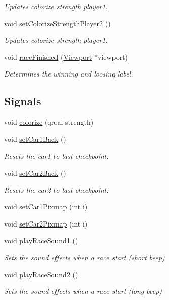 \begin{DoxyCompactItemize}
\begin{DoxyCompactList}\small\item\em Updates colorize strength player1. \end{DoxyCompactList}\item 
void \mbox{\hyperlink{class_world_aef2a19f30cc4445ea4d49dd5b2db6d78}{set\+Colorize\+Strength\+Player2}} ()
\begin{DoxyCompactList}\small\item\em Updates colorize strength player1. \end{DoxyCompactList}\item 
void \mbox{\hyperlink{class_world_a59863cbf211a2d2fdb5ef7ee85b2e246}{race\+Finished}} (\mbox{\hyperlink{class_viewport}{Viewport}} $\ast$viewport)
\begin{DoxyCompactList}\small\item\em Determines the winning and loosing label. \end{DoxyCompactList}\end{DoxyCompactItemize}
\subsection*{Signals}
\begin{DoxyCompactItemize}
\item 
void \mbox{\hyperlink{class_world_a3d52455b0d131b4ffa1ba208b248ade3}{colorize}} (qreal strength)
\item 
void \mbox{\hyperlink{class_world_a0b39f9fe5ef2682beb634bd4581593e4}{set\+Car1\+Back}} ()
\begin{DoxyCompactList}\small\item\em Resets the car1 to last checkpoint. \end{DoxyCompactList}\item 
void \mbox{\hyperlink{class_world_a57267831b353e52db5c3104dfa809015}{set\+Car2\+Back}} ()
\begin{DoxyCompactList}\small\item\em Resets the car2 to last checkpoint. \end{DoxyCompactList}\item 
void \mbox{\hyperlink{class_world_a4177c9d6ebf5382d7645d839d860b32a}{set\+Car1\+Pixmap}} (int i)
\item 
void \mbox{\hyperlink{class_world_a9fdd7ce2f9ff959732c68417ba01cf16}{set\+Car2\+Pixmap}} (int i)
\item 
void \mbox{\hyperlink{class_world_af537b17705920a98ca49eef2b15822be}{play\+Race\+Sound1}} ()
\begin{DoxyCompactList}\small\item\em Sets the sound effects when a race start (short beep) \end{DoxyCompactList}\item 
void \mbox{\hyperlink{class_world_ad34df1c5b2395b378c3092647bfe8759}{play\+Race\+Sound2}} ()
\begin{DoxyCompactList}\small\item\em Sets the sound effects when a race start (long beep) \end{DoxyCompactList}\end{DoxyCompactItemize}
